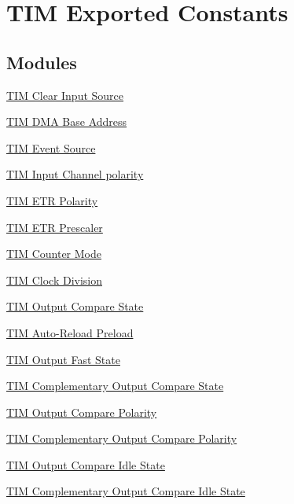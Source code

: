 \hypertarget{group___t_i_m___exported___constants}{}\section{T\+IM Exported Constants}
\label{group___t_i_m___exported___constants}
\subsection*{Modules}
\begin{DoxyCompactItemize}
\item 
\hyperlink{group___t_i_m___clear_input___source}{T\+I\+M Clear Input Source}
\item 
\hyperlink{group___t_i_m___d_m_a___base__address}{T\+I\+M D\+M\+A Base Address}
\item 
\hyperlink{group___t_i_m___event___source}{T\+I\+M Event Source}
\item 
\hyperlink{group___t_i_m___input___channel___polarity}{T\+I\+M Input Channel polarity}
\item 
\hyperlink{group___t_i_m___e_t_r___polarity}{T\+I\+M E\+T\+R Polarity}
\item 
\hyperlink{group___t_i_m___e_t_r___prescaler}{T\+I\+M E\+T\+R Prescaler}
\item 
\hyperlink{group___t_i_m___counter___mode}{T\+I\+M Counter Mode}
\item 
\hyperlink{group___t_i_m___clock_division}{T\+I\+M Clock Division}
\item 
\hyperlink{group___t_i_m___output___compare___state}{T\+I\+M Output Compare State}
\item 
\hyperlink{group___t_i_m___auto_reload_preload}{T\+I\+M Auto-\/\+Reload Preload}
\item 
\hyperlink{group___t_i_m___output___fast___state}{T\+I\+M Output Fast State}
\item 
\hyperlink{group___t_i_m___output___compare___n___state}{T\+I\+M Complementary Output Compare State}
\item 
\hyperlink{group___t_i_m___output___compare___polarity}{T\+I\+M Output Compare Polarity}
\item 
\hyperlink{group___t_i_m___output___compare___n___polarity}{T\+I\+M Complementary Output Compare Polarity}
\item 
\hyperlink{group___t_i_m___output___compare___idle___state}{T\+I\+M Output Compare Idle State}
\item 
\hyperlink{group___t_i_m___output___compare___n___idle___state}{T\+I\+M Complementary Output Compare Idle State}

\end{DoxyCompactItemize}
